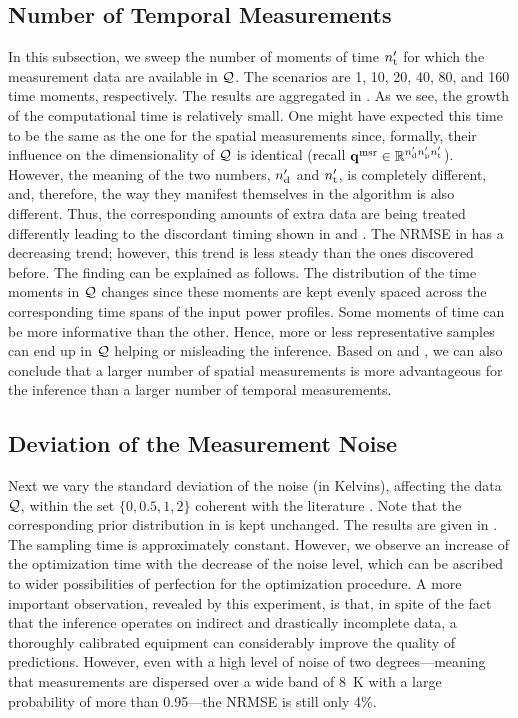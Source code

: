 \subsection{Number of Temporal Measurements}
In this subsection, we sweep the number of moments of time ${n_\text{t}'}$ for which the measurement data are available in $\mathcal{Q}$. The scenarios are 1, 10, 20, 40, 80, and 160 time moments, respectively. The results are aggregated in .
As we see, the growth of the computational time is relatively small. One might have expected this time to be the same as the one for the spatial measurements since, formally, their influence on the dimensionality of $\mathcal{Q}$ is identical (recall $\mathbf{q}^{\text{msr}} \in \mathbb{R}^{{n_\text{d}'} {n_\text{p}'} {n_\text{t}'}}$). However, the meaning of the two numbers, ${n_\text{d}'}$ and ${n_\text{t}'}$, is completely different, and, therefore, the way they manifest themselves in the algorithm is also different. Thus, the corresponding amounts of extra data are being treated differently leading to the discordant timing shown in  and .
The NRMSE in  has a decreasing trend; however, this trend is less steady than the ones discovered before. The finding can be explained as follows. The distribution of the time moments in $\mathcal{Q}$ changes since these moments are kept evenly spaced across the corresponding time spans of the input power profiles.
Some moments of time can be more informative than the other.
Hence, more or less representative samples can end up in $\mathcal{Q}$ helping or misleading the inference.
Based on  and , we can also conclude that a larger number of spatial measurements is more advantageous for the inference than a larger number of temporal measurements.

\subsection{Deviation of the Measurement Noise}
Next we vary the standard deviation of the noise (in Kelvins), affecting the data $\mathcal{Q}$, within the set $\{ 0, 0.5, 1, 2 \}$ coherent with the literature \cite{mesa-martinez2007}. Note that the corresponding prior distribution in  is kept unchanged. The results are given in .
The sampling time is approximately constant. However, we observe an increase of the optimization time with the decrease of the noise level, which can be ascribed to wider possibilities of perfection for the optimization procedure.
A more important observation, revealed by this experiment, is that, in spite of the fact that the inference operates on indirect and drastically incomplete data, a thoroughly calibrated equipment can considerably improve the quality of predictions.
However, even with a high level of noise of two degrees---meaning that measurements are dispersed over a wide band of 8~K with a large probability of more than 0.95---the NRMSE is still only 4\%.

